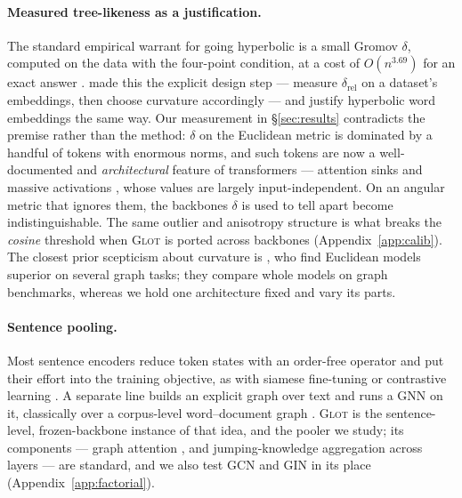 \documentclass{article}
\begin{document}
\paragraph{Measured tree-likeness as a justification.} The standard empirical
warrant for going hyperbolic is a small Gromov $\delta$, computed on the data
with the four-point condition, at a cost of $O(n^{3.69})$ for an exact answer
\citep{fournier2015gromov}. \citet{khrulkov2020hyperbolicimage}
made this the explicit design step --- measure $\delta_{\text{rel}}$ on a
dataset's embeddings, then choose curvature accordingly --- and
\citet{tifrea2018poincareglove} justify hyperbolic word embeddings the same
way. Our measurement in \S\ref{sec:results} contradicts the premise rather than
the method: $\delta$ on the Euclidean metric is dominated by a handful of tokens
with enormous norms, and such tokens are now a well-documented and
\emph{architectural} feature of transformers --- attention sinks
\citep{xiao2024attentionsinks} and massive activations
\citep{sun2024massiveactivations}, whose values are largely input-independent.
On an angular metric that ignores them, the backbones $\delta$ is used to tell
apart become indistinguishable. The same outlier and anisotropy structure
\citep{ethayarajh2019contextual,gao2019degeneration} is what breaks the
\emph{cosine} threshold when \textsc{Glot} is ported across backbones
(Appendix~\ref{app:calib}). The closest prior scepticism about curvature is
\citet{kochurov2020createdequal}, who find Euclidean models superior on several
graph tasks; they compare whole models on graph benchmarks, whereas we hold one
architecture fixed and vary its parts.

\paragraph{Sentence pooling.} Most sentence encoders reduce token states with an
order-free operator and put their effort into the training objective, as with
siamese fine-tuning \citep{reimers2019sbert} or contrastive learning
\citep{gao2021simcse}. A separate line builds an explicit graph over text and
runs a GNN on it, classically over a corpus-level word--document graph
\citep{yao2019textgcn}. \textsc{Glot} \citep{mantri2026glot} is the
sentence-level, frozen-backbone instance of that idea, and the pooler we study;
its components --- graph attention \citep{velickovic2018gat}, and
jumping-knowledge aggregation across layers \citep{xu2018jk} --- are standard, and
we also test GCN \citep{kipf2017gcn} and GIN \citep{xu2019gin} in its place
(Appendix~\ref{app:factorial}).
\end{document}
